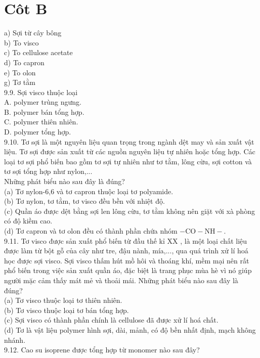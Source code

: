 \documentclass[10pt]{article}
\begin{document}
\section*{Côt B}
a) Sợi từ cây bông\\
b) To visco\\
c) To cellulose acetate\\
d) To capron\\
e) To olon\\
g) Tơ tằm\\
9.9. Sợi visco thuộc loại\\
A. polymer trùng ngưng.\\
B. polymer bán tổng hợp.\\
C. polymer thiên nhiên.\\
D. polymer tổng hợp.\\
9.10. Tơ sợi là một nguyên liệu quan trọng trong ngành dệt may và sản xuất vật liệu. Tơ sợi được sản xuất từ các nguồn nguyên liệu tự nhiên hoặc tổng hợp. Các loại tơ sợi phổ biến bao gồm tơ sợi tự nhiên như tơ tằm, lông cừu, sợi cotton và tơ sợi tổng hợp như nylon,...\\
Những phát biểu nào sau đây là đúng?\\
(a) Tơ nylon-6,6 và tơ capron thuộc loại tơ polyamide.\\
(b) Tơ nylon, tơ tằm, tơ visco đều bền với nhiệt độ.\\
(c) Quần áo được dệt bằng sợi len lông cừu, tơ tằm không nên giặt với xà phòng có độ kiềm cao.\\
(d) Tơ capron và tơ olon đều có thành phần chứa nhóm $-\mathrm{CO}-\mathrm{NH}-$.\\
9.11. Tơ visco được sản xuất phổ biến từ đầu thế kỉ XX , là một loại chất liệu được làm từ bột gỗ của cây như tre, đậu nành, mía,..., qua quá trình xử lí hoá học được sợi visco. Sợi visco thấm hút mồ hôi và thoáng khí, mềm mại nên rất phổ biến trong việc sản xuất quần áo, đặc biệt là trang phục mùa hè vì nó giúp người mặc cảm thấy mát mẻ và thoải mái. Những phát biểu nào sau đây là đúng?\\
(a) Tơ visco thuộc loại tơ thiên nhiên.\\
(b) Tơ visco thuộc loại tơ bán tổng hợp.\\
(c) Sợi visco có thành phần chính là cellulose đã được xử lí hoá chất.\\
(d) Tơ là vật liệu polymer hình sợi, dài, mảnh, có độ bền nhất định, mạch không nhánh.\\
9.12. Cao su isoprene được tổng hợp từ monomer nào sau đây?\\
\end{document}
